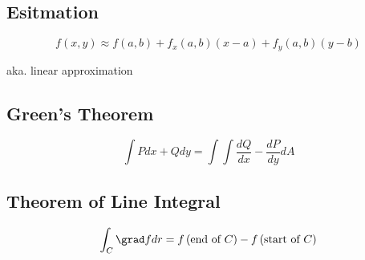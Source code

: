   \subsection{Esitmation}

    \begin{equation}
      f\left( x, y \right)
      \approx f\left( a, b \right)
      + f_{x} \left( a, b \right) \left( x - a \right)
      + f_{y} \left( a, b \right) \left( y - b \right)
    \end{equation}

    aka. linear approximation

  \subsection{Green's Theorem}

    \begin{equation}
      \int P dx + Q dy = \int \int \frac{dQ}{dx} - \frac{dP}{dy} dA
    \end{equation}

  \subsection{Theorem of Line Integral}

    \begin{equation}
      \int_{C} \grad f dr = f\left( \text{end of } C \right) - f\left( \text{start of } C \right)
    \end{equation}